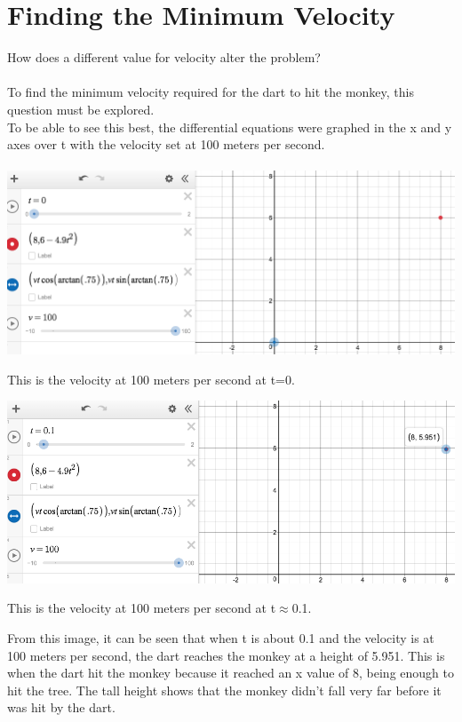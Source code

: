 \documentclass[12pt]{article}
\begin{document}
\section{Finding the Minimum Velocity}
How does a different value for velocity alter the problem?\\\\
To find the minimum velocity required for the dart to hit the monkey, this question must be explored.\\
To be able to see this best, the differential equations were graphed in the x and y axes over t with the velocity set at 100 meters per second.\\\\
\includegraphics[scale=0.48]{picture1}
\begin{center}
    This is the velocity at 100 meters per second at t=0.
\end{center}
\includegraphics[scale=0.48]{picture2}
\begin{center}
    This is the velocity at 100 meters per second at t$\approx$0.1.
\end{center}
From this image, it can be seen that when t is about 0.1 and the velocity is at 100 meters per second, the dart reaches the monkey at a height of 5.951. This is when the dart hit the monkey because it reached an x value of 8, being enough to hit the tree. The tall height shows that the monkey didn't fall very far before it was hit by the dart.\\\\
\end{document}
